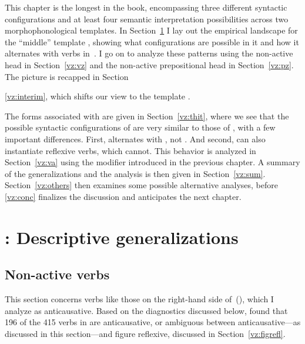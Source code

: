 This chapter is the longest in the book, encompassing three different syntactic configurations and at least four semantic interpretation possibilities across two morphophonological templates. In Section~\ref{vz:tnif} I lay out the empirical landscape for the ``middle'' template {\tnif}, showing what configurations are possible in it and how it alternates with verbs in~{\tkal}. I go on to analyze these patterns using the non-active head {\vz} in Section~\ref{vz:vz} and the non-active prepositional head {\pz} in Section~\ref{vz:pz}. The picture is recapped in Section~{\ref{vz:interim}, which shifts our view to the template {\thit}.

The forms associated with {\thit} are given in Section~\ref{vz:thit}, where we see that the possible syntactic configurations of {\thit} are very similar to those of {\tnif}, with a few important differences. First, {\thit} alternates with {\tpie}, not {\tkal}. And second, {\thit} can also instantiate reflexive verbs, which {\tnif} cannot. This behavior is analyzed in Section~\ref{vz:va} using the modifier {\va} introduced in the previous chapter. A summary of the generalizations and the analysis is then given in Section~\ref{vz:sum}. Section~\ref{vz:others} then examines some possible alternative analyses, before \ref{vz:conc} finalizes the discussion and anticipates the next chapter.


\section{\tnif: Descriptive generalizations} \label{vz:tnif}

	\subsection{Non-active verbs} \label{vz:tnif:nact}
This section concerns verbs like those on the right-hand side of~(\nextx), which I analyze as anticausative. Based on the diagnostics discussed below, \cite{ahdoutkastner18} found that 196 of the 415 verbs in {\tnif} are anticausative, or ambiguous between anticausative---as discussed in this section---and figure reflexive, discussed in Section~\ref{vz:figrefl}.
\ex{}
\xe

}
